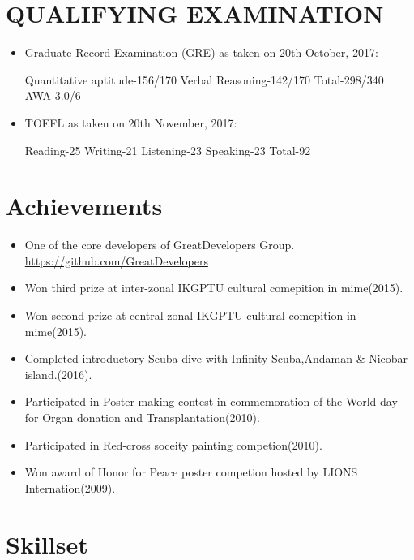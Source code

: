 \documentclass[10.1pt,a4paper,sans]{moderncv}        %
\begin{document}
\section{QUALIFYING EXAMINATION}

\vspace{3pt}

\begin{itemize}

\item Graduate Record Examination (GRE) as taken on 20th October, 2017:

Quantitative aptitude-156/170 Verbal Reasoning-142/170 Total-298/340 AWA-3.0/6 

\item  TOEFL as taken on 20th November, 2017:

Reading-25 Writing-21 Listening-23 Speaking-23 Total-92


\end{itemize}

\section{Achievements}

\vspace{3pt}

\begin{itemize}

\item One of the core developers of GreatDevelopers Group. \href{https://github.com/orgs/GreatDevelopers/people}{https://github.com/GreatDevelopers}
\item Won third prize at inter-zonal IKGPTU cultural comepition in mime(2015). 
\item Won second prize at central-zonal IKGPTU cultural comepition in mime(2015).
\item Completed introductory Scuba dive with Infinity Scuba,Andaman & Nicobar island.(2016).
\item Participated in Poster making contest in commemoration of the World day for Organ donation and Transplantation(2010).
\item Participated in Red-cross soceity painting competion(2010).
\item Won award of Honor for Peace poster competion hosted by LIONS Internation(2009).


\end{itemize}

\section{Skillset}
\end{document}
